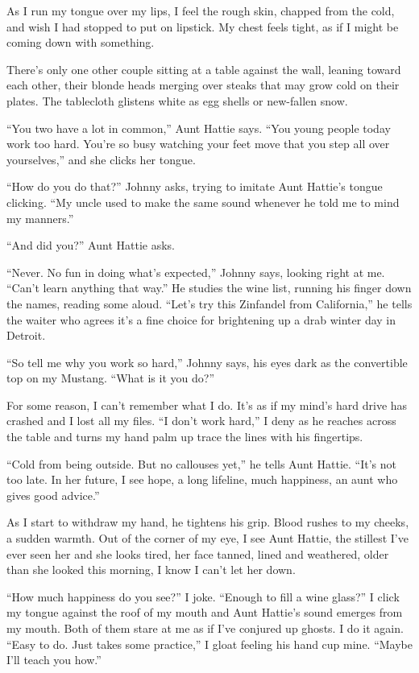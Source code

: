 \documentclass[
]{article}
\begin{document}
As I run my tongue over my lips, I feel the rough skin, chapped from the
cold, and wish I had stopped to put on lipstick. My chest feels tight,
as if I might be coming down with something.

There's only one other couple sitting at a table against the wall,
leaning toward each other, their blonde heads merging over steaks that
may grow cold on their plates. The tablecloth glistens white as egg
shells or new-fallen snow.

``You two have a lot in common,'' Aunt Hattie says. ``You young people
today work too hard. You're so busy watching your feet move that you
step all over yourselves,'' and she clicks her tongue.

``How do you do that?'' Johnny asks, trying to imitate Aunt Hattie's
tongue clicking. ``My uncle used to make the same sound whenever he told
me to mind my manners.''

``And did you?'' Aunt Hattie asks.

``Never. No fun in doing what's expected,'' Johnny says, looking right
at me. ``Can't learn any­thing that way.'' He studies the wine list,
running his finger down the names, reading some aloud. ``Let's try this
Zinfandel from California,'' he tells the waiter who agrees it's a fine
choice for brighten­ing up a drab winter day in Detroit.

``So tell me why you work so hard,'' Johnny says, his eyes dark as the
convertible top on my Mustang. ``What is it you do?''

For some reason, I can't remember what I do. It's as if my mind's hard
drive has crashed and I lost all my files. ``I don't work hard,'' I deny
as he reaches across the table and turns my hand palm up trace the lines
with his fingertips.

``Cold from being outside. But no callouses yet,'' he tells Aunt Hattie.
``It's not too late. In her future, I see hope, a long lifeline, much
happiness, an aunt who gives good advice.''

As I start to withdraw my hand, he tightens his grip. Blood rushes to my
cheeks, a sudden warmth. Out of the corner of my eye, I see Aunt Hattie,
the stillest I've ever seen her and she looks tired, her face tanned,
lined and weathered, older than she looked this morning, I know I can't
let her down.

``How much happiness do you see?'' I joke. ``Enough to fill a wine
glass?'' I click my tongue against the roof of my mouth and Aunt
Hattie's sound emerges from my mouth. Both of them stare at me as if
I've conjured up ghosts. I do it again. ``Easy to do. Just takes some
practice,'' I gloat feeling his hand cup mine. ``Maybe I'll teach you
how.''
\end{document}
